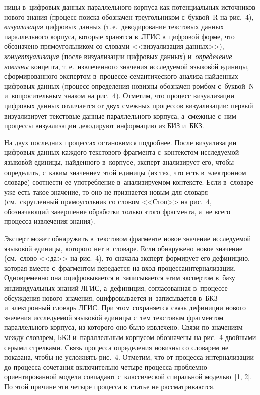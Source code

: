 \begin{multicols}{2}

\noindent
 ницы в~циф\-ро\-вых данных параллельного 
корпуса как потенциальных источников нового знания (процесс поиска 
обозначен треугольником с~бук\-вой~R на рис.~4), \textit{визуализация} 
цифровых данных (т.\,е.\ декодирование текс\-то\-вых данных параллельного 
корпуса, которые хранятся в~ЛГИС в~циф\-ро\-вой форме, что обозначено 
прямоугольником со словами <<визуализация данных>>), 
\textit{концептуализация} (после визуализации цифровых данных) 
и~\textit{определение новизны} концепта, т.\,е.\ извлеченного значения 
исследуемой языков$\acute{\mbox{о}}$й единицы, сформированного 
экспертом в~процессе семантического анализа найден\-ных циф\-ро\-вых данных 
(процесс определения новизны обозначен ромбом с~бук\-вой~N 
и~вопросительным знаком на рис.~4). Отметим, что процесс визуализации 
циф\-ро\-вых данных отличается от двух смеж\-ных процессов визуализации: 
первый визуализирует текс\-то\-вые данные параллельного корпуса, а~смежны\-е 
с~ним процессы визуализации декодируют информацию из БИЗ 
и~БКЗ.
  
  На двух последних процессах остановимся по\-дроб\-нее. После визуализации 
циф\-ро\-вых данных каж\-до\-го текс\-то\-во\-го фрагмента с~контекстом ис\-сле\-ду\-емой 
языков$\acute{\mbox{о}}$й единицы, найденного в~корпусе, эксперт 
анализирует его, чтобы определить, с~каким значением этой единицы (из тех, 
что есть в~электронном словаре) соотнести ее упо\-треб\-ле\-ние в~ана\-ли\-зи\-ру\-емом 
контексте. Если в~словаре уже есть такое значение, то оно не признается новым 
для словаря (см.\ скруг\-лен\-ный прямоугольник со словом <<Стоп>> на рис.~4, 
обозначающий завершение обработки только этого фрагмента, а~не всего 
процесса извлечения знания).
  
  Эксперт может обнаружить в~текстовом фрагменте новое значение 
исследуемой языков$\acute{\mbox{о}}$й единицы, которого нет в~словаре. 
Если обнаружено новое значение (см.\ слово <<да>> на рис.~4), то сначала 
эксперт формирует его дефиницию, которая вместе с~фрагментом передается на 
вход процесса\linebreak интернализации. Одновременно она оциф\-ро\-вы\-ва\-ет\-ся 
и~записывается этим экспертом в~базу индивидуальных знаний ЛГИС, 
а~дефиниция, согласованная в~процессе обсуждения нового значения, 
\mbox{оцифровывается} и~записывается в~БКЗ и~электронный 
словарь ЛГИС. При этом сохраняется связь дефиниции нового значения 
ис\-сле\-ду\-емой языков$\acute{\mbox{о}}$й единицы с~тем текстовым фрагментом 
параллельного корпуса, из которого оно было извлечено. Связи по значениям 
между словарем, БКЗ и~параллельным корпусом 
обозначены на рис.~4 двойными серыми стрелками. Связь процесса 
определения новизны со словарем не показана, чтобы не усложнять рис.~4. 
Отметим, что от процесса интернализации до процесса сочетания 
включительно четыре процесса проб\-лем\-но-ори\-ен\-ти\-ро\-ван\-ной модели 
совпадают с~классической спиральной моделью~[1, 2]. По этой причине эти 
четыре процесса в~статье не рас\-смат\-ри\-ва\-ются.
  

\end{multicols}
